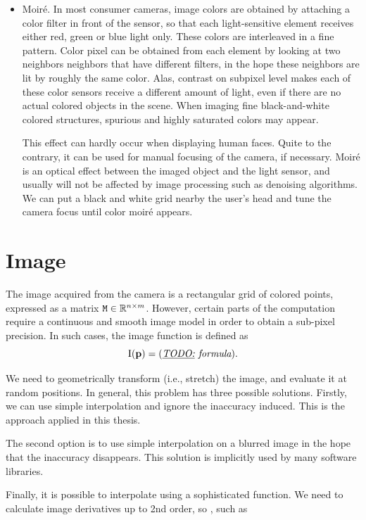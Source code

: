 \begin{itemize}
\item
Moiré.
In most consumer cameras, image colors are obtained by attaching a color filter in front of the sensor, so that each light-sensitive element receives either red, green or blue light only.
These colors are interleaved in a fine pattern.
Color pixel can be obtained from each element by looking at two neighbors neighbors that have different filters, in the hope these neighbors are lit by roughly the same color.
Alas, contrast on subpixel level makes each of these color sensors receive a different amount of light, even if there are no actual colored objects in the scene.
When imaging fine black-and-white colored structures, spurious and highly saturated colors may appear.

This effect can hardly occur when displaying human faces.
Quite to the contrary, it can be used for manual focusing of the camera, if necessary.
Moiré is an optical effect between the imaged object and the light sensor, and usually will not be affected by image processing such as denoising algorithms.
We can put a black and white grid nearby the user's head and tune the camera focus until color moiré appears.

\end{itemize}

\section{Image}
\label{s.imagemodel}

The image acquired from the camera is a rectangular grid of colored points, expressed as a matrix $\mathtt{M} \in \mathbb{R}^{n\times m}$.
However, certain parts of the computation require a continuous and smooth image model in order to obtain a sub-pixel precision.
In such cases, the image function is defined as
$$\mathrm{I}(\mathbf{p}) = (\textit{\underline{TODO:} formula}).$$

We need to geometrically transform (i.e., stretch) the image, and evaluate it at random positions.
In general, this problem has three possible solutions.
Firstly, we can use simple interpolation and ignore the inaccuracy induced.
This is the approach applied in this thesis.

The second option is to use simple interpolation on a blurred image in the hope that the inaccuracy disappears.
This solution is implicitly used by many software libraries.

Finally, it is possible to interpolate using a sophisticated function.
We need to calculate image derivatives up to 2nd order, so , such as

